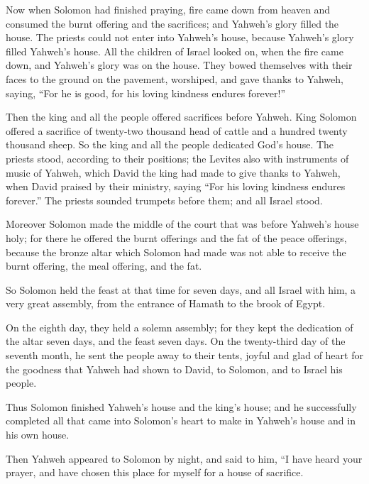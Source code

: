  Now when Solomon had finished praying, fire came down from
heaven and consumed the burnt offering and the sacrifices; and Yahweh's
glory filled the house.  The priests could not enter into
Yahweh's house, because Yahweh's glory filled Yahweh's house.
 All the children of Israel looked on, when the fire came
down, and Yahweh's glory was on the house. They bowed themselves with
their faces to the ground on the pavement, worshiped, and gave thanks to
Yahweh, saying, ``For he is good, for his loving kindness endures
forever!''

 Then the king and all the people offered sacrifices before
Yahweh.  King Solomon offered a sacrifice of twenty-two
thousand head of cattle and a hundred twenty thousand sheep. So the king
and all the people dedicated God's house.  The priests
stood, according to their positions; the Levites also with instruments
of music of Yahweh, which David the king had made to give thanks to
Yahweh, when David praised by their ministry, saying ``For his loving
kindness endures forever.'' The priests sounded trumpets before them;
and all Israel stood.

 Moreover Solomon made the middle of the court that was
before Yahweh's house holy; for there he offered the burnt offerings and
the fat of the peace offerings, because the bronze altar which Solomon
had made was not able to receive the burnt offering, the meal offering,
and the fat.

 So Solomon held the feast at that time for seven days, and
all Israel with him, a very great assembly, from the entrance of Hamath
to the brook of Egypt.

 On the eighth day, they held a solemn assembly; for they
kept the dedication of the altar seven days, and the feast seven days.
 On the twenty-third day of the seventh month, he sent the
people away to their tents, joyful and glad of heart for the goodness
that Yahweh had shown to David, to Solomon, and to Israel his people.

 Thus Solomon finished Yahweh's house and the king's house;
and he successfully completed all that came into Solomon's heart to make
in Yahweh's house and in his own house.

 Then Yahweh appeared to Solomon by night, and said to him,
``I have heard your prayer, and have chosen this place for myself for a
house of sacrifice.

